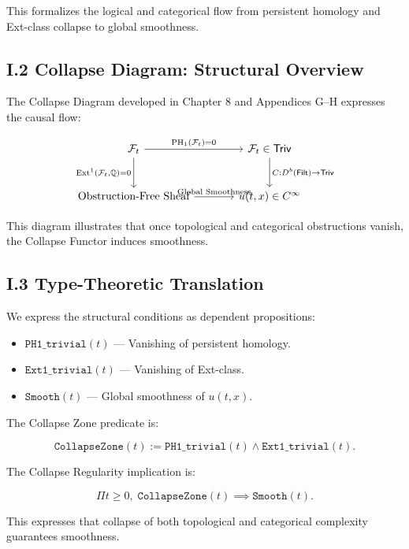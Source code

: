 \documentclass[11pt]{article}
\begin{document}
This formalizes the logical and categorical flow from persistent homology and Ext-class collapse to global smoothness.

\subsection*{I.2 Collapse Diagram: Structural Overview}

The Collapse Diagram developed in Chapter 8 and Appendices G–H expresses the causal flow:

\[
\begin{tikzcd}[row sep=large, column sep=large]
\mathcal{F}_t
  \arrow[r, "{\mathrm{PH}_1(\mathcal{F}_t) = 0}"]
  \arrow[d, "{\mathrm{Ext}^1(\mathcal{F}_t, \mathbb{Q}) = 0}"']
& \mathcal{F}_t \in \mathsf{Triv}
  \arrow[d, "{C : D^b(\mathsf{Filt}) \to \mathsf{Triv}}"] \\
\text{Obstruction-Free Sheaf}
  \arrow[r, "{\text{Global Smoothness}}"]
& u(t, x) \in C^\infty
\end{tikzcd}
\]

This diagram illustrates that once topological and categorical obstructions vanish, the Collapse Functor induces smoothness.

\subsection*{I.3 Type-Theoretic Translation}

We express the structural conditions as dependent propositions:

\begin{itemize}
  \item \( \texttt{PH1\_trivial}(t) \) — Vanishing of persistent homology.
  \item \( \texttt{Ext1\_trivial}(t) \) — Vanishing of Ext-class.
  \item \( \texttt{Smooth}(t) \) — Global smoothness of \( u(t, x) \).
\end{itemize}

The Collapse Zone predicate is:

\[
\texttt{CollapseZone}(t) := \texttt{PH1\_trivial}(t) \land \texttt{Ext1\_trivial}(t).
\]

The Collapse Regularity implication is:

\[
\Pi t \geq 0,\; \texttt{CollapseZone}(t) \implies \texttt{Smooth}(t).
\]

This expresses that collapse of both topological and categorical complexity guarantees smoothness.
\end{document}
